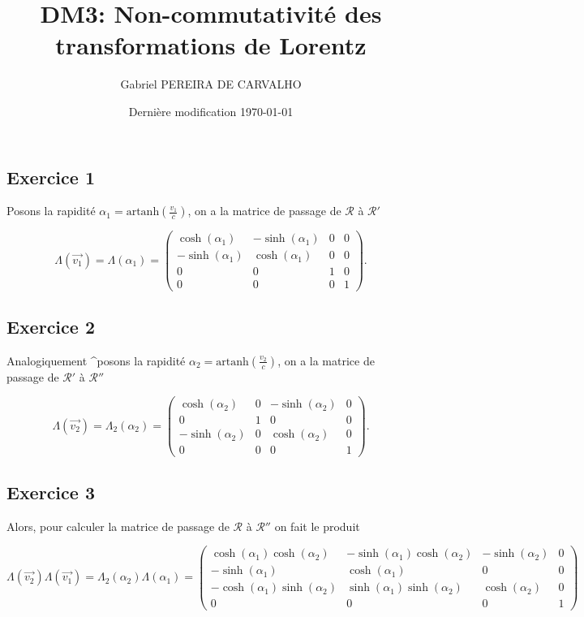 \documentclass[french]{article}
\begin{document}
	\title{DM3: Non-commutativité des transformations de Lorentz}
	\author{Gabriel PEREIRA DE CARVALHO}
	\date{Dernière modification \today}
	
	\maketitle
	
	\subsection*{Exercice 1}
	
	Posons la rapidité $\alpha_1 = \mathrm{artanh}\left(\frac{v_1}{c}\right)$, on a la matrice de passage de $\mathcal{R}$ à $\mathcal{R}'$
	
	$$ \Lambda(\vec{v_1}) = \Lambda(\alpha_1) = \begin{pmatrix}
	\cosh(\alpha_1) & -\sinh(\alpha_1) & 0 & 0 \\
	-\sinh(\alpha_1) & \cosh(\alpha_1) & 0 & 0 \\
	0 & 0 & 1 & 0 \\
	0 & 0 & 0 & 1
	\end{pmatrix}.$$
	
	\subsection*{Exercice 2}
	
	Analogiquement ^posons la rapidité $\alpha_2 = \mathrm{artanh}\left(\frac{v_2}{c}\right)$, on a la matrice de passage de $\mathcal{R}'$ à $\mathcal{R}''$
	
	$$ \Lambda(\vec{v_2}) = \Lambda_2(\alpha_2) = \begin{pmatrix}
	\cosh(\alpha_2) & 0 &  -\sinh(\alpha_2) & 0 \\
	0 & 1 & 0 & 0 \\
	-\sinh(\alpha_2) & 0 & \cosh(\alpha_2) & 0 \\
	0 & 0 & 0 & 1
	\end{pmatrix}.$$
	
	\subsection*{Exercice 3}
	
	Alors, pour calculer la matrice de passage de $\mathcal{R}$ à $\mathcal{R}''$ on fait le produit
	
	$$ \Lambda(\vec{v_2}) \Lambda(\vec{v_1}) = \Lambda_2(\alpha_2) \Lambda(\alpha_1) = \begin{pmatrix}
	\cosh(\alpha_1)\cosh(\alpha_2) & -\sinh(\alpha_1)\cosh(\alpha_2) & -\sinh(\alpha_2) & 0 \\
	-\sinh(\alpha_1) & \cosh(\alpha_1) & 0 & 0 \\
	-\cosh(\alpha_1)\sinh(\alpha_2) & \sinh(\alpha_1)\sinh(\alpha_2) & \cosh(\alpha_2) & 0 \\
	0 & 0 & 0 & 1
	\end{pmatrix}
	$$
	
\end{document}

